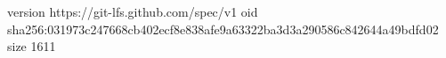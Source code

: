 version https://git-lfs.github.com/spec/v1
oid sha256:031973c247668cb402ecf8e838afe9a63322ba3d3a290586c842644a49bdfd02
size 1611
